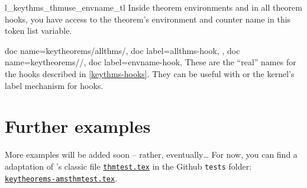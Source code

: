 \documentclass{ltxdoc}
\begin{document}
\begin{docCommand}{l_keythms_thmuse_envname_tl}{}
Inside theorem environments and in all theorem hooks, you have access to the theorem's environment and counter name in this token list variable.
\end{docCommand}

\begin{docKeys}[doc no index,color key=black]
  {
    {
      doc name=keytheorems/allthms/\textmd{},
      doc label=allthms-hook,
    },
    {
      doc name=keytheorems/\textmd{}/\textmd{},
      doc label=envname-hook,
    }
  }
These are the ``real'' names for the hooks described in \autoref{keythms-hooks}.
They can be useful with  or the kernel's label mechanism for hooks.
\end{docKeys}

\section{Further examples}

More examples will be added soon -- rather, eventually\dots{}
For now, you can find a  adaptation of 's classic file \href{https://mirrors.ctan.org/macros/latex/required/amscls/doc/thmtest.tex}{\texttt{thmtest.tex}} in the Github \texttt{tests} folder: \href{https://github.com/mbertucci47/keytheorems/blob/develop/tests/keytheorems-amsthmtest.tex}{\texttt{keytheorems-amsthmtest.tex}}.


\printindex
\end{document}
